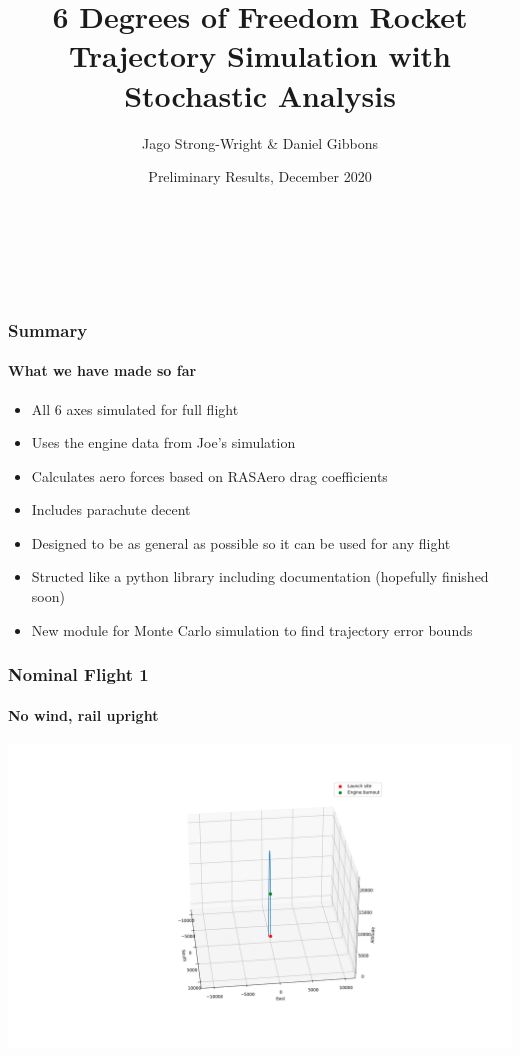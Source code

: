 \documentclass{beamer}
\title[6DOF Trajectory Simulation: Preliminary Results]{6 Degrees of Freedom Rocket Trajectory Simulation with Stochastic Analysis} %
\author%
{Jago Strong-Wright \& Daniel Gibbons
}
\institute%
{%
    \textit{}\\
    \textit{}
}
\date[Dec 2020]{Preliminary Results, December 2020} %
\begin{document}
    \begin{frame}
        \begin{titlepage}
                {\inserttitle\\[.9cm]}
                {\insertauthor\par}
                {\insertinstitute\\[0.3cm]}
                {\insertdate}
        \end{titlepage}
    \end{frame}
    \begin{frame}
        \frametitle{Summary}
        \framesubtitle{What we have made so far}

        \begin{itemize}
            \item All 6 axes simulated for full flight
            \item Uses the engine data from Joe's simulation 
            \item Calculates aero forces based on RASAero drag coefficients
            \item Includes parachute decent
            \item Designed to be as general as possible so it can be used for any flight
            \item Structed like a python library including documentation (hopefully finished soon)
            \item New module for Monte Carlo simulation to find trajectory error bounds
        \end{itemize} 

    \end{frame}
    \begin{frame}
        \frametitle{Nominal Flight 1}
        \framesubtitle{No wind, rail upright}
        \begin{center}
            \includegraphics[width=\textwidth]{images/example1.png}
        \end{center}
    \end{frame}
\end{document}
